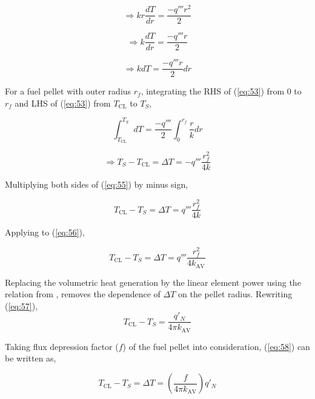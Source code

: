 \begin{equation}
  \Rightarrow kr \frac{dT}{dr} =\frac{-q'''r^2}{2} 
\end{equation}

\begin{equation}
  \Rightarrow k\frac{dT}{dr} =\frac{-q'''r}{2}
\end{equation}

\begin{equation}
  \Rightarrow k dT =\frac{-q'''r}{2} dr \label{eq:53}
\end{equation}

For a fuel pellet with outer radius $r_f$, integrating the RHS of (\ref{eq:53})
from 0 to $r_f$ and LHS of (\ref{eq:53}) from $T_{\mathrm{CL}}$ to $T_S$,

\begin{equation}
\int^{T_S}_{T_{\mathrm{CL}}} dT= \frac{-q'''}{2}\int^{r_f}_{0}\frac{r}{k}dr \label{eq:54}
\end{equation}

\begin{equation}
\Rightarrow T_{S} - T_{\mathrm{CL}}=\Delta T = -q'''\frac{r_f^2}{4k} \label{eq:55}
\end{equation}

Multiplying both sides of (\ref{eq:55}) by minus sign,

\begin{equation}
T_{\mathrm{CL}} - {T_S}=\Delta T = q'''\frac{r_f^2}{4k} \label{eq:56}
\end{equation}

Applying  to (\ref{eq:56}),

\begin{equation}
{T_{\mathrm{CL}}} - {T_S}=\Delta T = q'''\frac{r_f^2}{4k_{\mathrm{AV}}} \label{eq:57}
\end{equation}

Replacing the volumetric heat generation by the linear element power using the
relation from , removes the dependence of $\Delta T$ on
the pellet radius. Rewriting (\ref{eq:57}),\\

\begin{equation}
T_{\mathrm{CL}}-T_S=\frac{q'_N}{4\pi k_{\mathrm{AV}}} \label{eq:58}
\end{equation}

Taking flux depression factor ($f$) of the fuel pellet into consideration,
(\ref{eq:58})  can be written as,

\begin{equation}
 T_{\mathrm{CL}}-T_S=\Delta T=(\frac{f }{4\pi k_{\mathrm{AV}}})q'_N \label{eq:tcl}
\end{equation}

